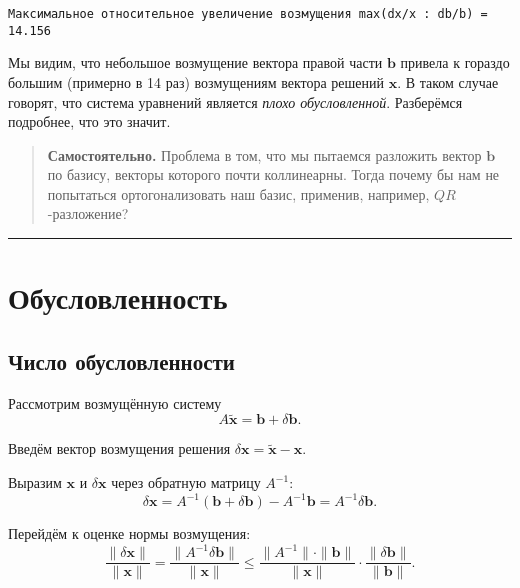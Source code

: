 \documentclass[11pt,a4paper]{article}
\begin{document}
    \begin{Verbatim}[commandchars=\\\{\}]
Максимальное относительное увеличение возмущения max(dx/x : db/b) = 14.156
    \end{Verbatim}

    Мы видим, что небольшое возмущение вектора правой части \(\mathbf{b}\)
привела к гораздо большим (примерно в 14 раз) возмущениям вектора
решений \(\mathbf{x}\). В таком случае говорят, что система уравнений
является \emph{плохо обусловленной}. Разберёмся подробнее, что это
значит.

    \begin{quote}
\textbf{Самостоятельно.} Проблема в том, что мы пытаемся разложить
вектор \(\mathbf{b}\) по базису, векторы которого почти коллинеарны.
Тогда почему бы нам не попытаться ортогонализовать наш базис, применив,
например, \(QR\)-разложение?
\end{quote}

    \begin{center}\rule{0.5\linewidth}{0.5pt}\end{center}

    \hypertarget{ux43eux431ux443ux441ux43bux43eux432ux43bux435ux43dux43dux43eux441ux442ux44c}{%
\section{Обусловленность}\label{ux43eux431ux443ux441ux43bux43eux432ux43bux435ux43dux43dux43eux441ux442ux44c}}

    \hypertarget{ux447ux438ux441ux43bux43e-ux43eux431ux443ux441ux43bux43eux432ux43bux435ux43dux43dux43eux441ux442ux438}{%
\subsection{Число
обусловленности}\label{ux447ux438ux441ux43bux43e-ux43eux431ux443ux441ux43bux43eux432ux43bux435ux43dux43dux43eux441ux442ux438}}

    Рассмотрим возмущённую систему \[
  A \tilde{\mathbf{x}} = \mathbf{b} + \delta\mathbf{b}.
\]

Введём вектор возмущения решения
\(\delta \mathbf{x} = \tilde{\mathbf{x}} - \mathbf{x}\).

Выразим \(\mathbf{x}\) и \(\delta\mathbf{x}\) через обратную матрицу
\(A^{-1}\): \[
  \delta \mathbf{x} = A^{-1}(\mathbf{b} + \delta\mathbf{b}) - A^{-1}\mathbf{b} = A^{-1}\delta\mathbf{b}.
\]

Перейдём к оценке нормы возмущения: \[
  \frac{\|\delta \mathbf{x}\|}{\|\mathbf{x}\|} = \frac{\|A^{-1} \delta \mathbf{b}\|}{\|\mathbf{x}\|} \le \frac{\|A^{-1}\| \cdot \|\mathbf{b}\|}{\|\mathbf{x}\|} \cdot \frac{\|\delta \mathbf{b}\|}{\|\mathbf{b}\|}.
\]
\end{document}
